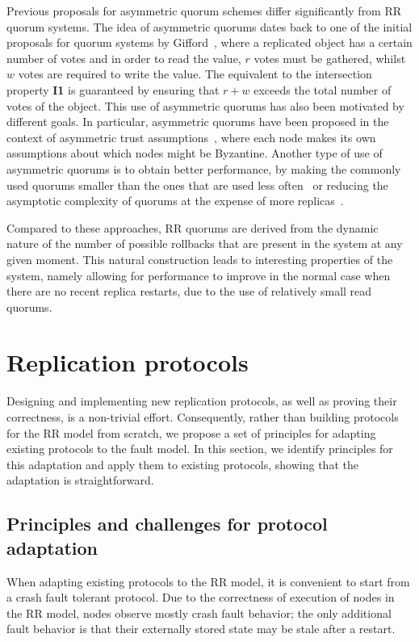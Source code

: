 Previous proposals for asymmetric quorum schemes differ
significantly from \ac{RR} quorum systems.  The idea of
asymmetric quorums dates back to one of the initial proposals for
quorum systems by Gifford~\cite{weighted_voting}, where a
replicated object has a certain number of votes and in order to
read the value, $r$ votes must be gathered, whilst $w$ votes
are required to write the value. The equivalent to the
intersection property \textbf{I1} is guaranteed by ensuring that
$r + w$ exceeds the total number of votes of the object. This use
of asymmetric quorums has also been motivated by different goals.
In particular, asymmetric quorums have been proposed in the
context of asymmetric trust assumptions~\cite{asymmetric_trust},
where each node makes its own assumptions about which nodes might
be Byzantine. Another type of use of asymmetric quorums is to
obtain better performance, by making the commonly used quorums
smaller than the ones that are used less
often~\cite{fp,wheat,rqs} or reducing the asymptotic complexity
of quorums at the expense of more replicas~\cite{grid_quorums}.

Compared to these approaches, \ac{RR} quorums are derived from
the dynamic nature of the number of possible rollbacks that are
present in the system at any given moment. This natural
construction leads to interesting properties of the system,
namely allowing for performance to improve in the normal case
when there are no recent replica restarts, due to the use of
relatively small read quorums.

\section{Replication protocols}\label{sec:protocol}

Designing and implementing new replication protocols, as well as
proving their correctness, is a non-trivial effort. Consequently,
rather than building protocols for the \ac{RR} model from
scratch, we propose a set of principles for adapting existing
protocols to the fault model. In this section, we identify
principles for this adaptation and apply them to existing
protocols, showing that the adaptation is straightforward.

\subsection{Principles and challenges for protocol adaptation}\label{ssec:adaptation}

When adapting existing protocols to the \ac{RR} model, it is
convenient to start from a crash fault tolerant protocol.
Due to the correctness of execution of nodes in the \ac{RR}
model, nodes observe mostly crash fault behavior; the only
additional fault behavior is that their externally stored state
may be stale after a restart.

